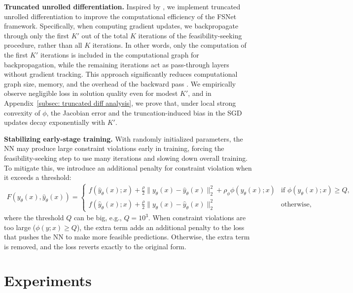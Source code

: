 \documentclass{article}
\def\x{x}
\def\y{y_{\theta}}   \def\hy{\hat{y}_{\theta}}    \def\ty{\Tilde{y}}
\begin{document}
\textbf{Truncated unrolled differentiation.} Inspired by \cite{shaban2019truncated}, we implement truncated unrolled differentiation to improve the computational efficiency of the FSNet framework. Specifically, when computing gradient updates, we backpropagate through only the first $K'$ out of the total $K$ iterations of the feasibility-seeking procedure, rather than all $K$ iterations.
In other words, only the computation of the first $K'$ iterations is included in the computational graph for backpropagation, while the remaining iterations act as pass-through layers without gradient tracking. 
This approach significantly reduces computational graph size, memory, and the overhead of the backward pass \cite{shaban2019truncated}. 
We empirically observe negligible loss in solution quality even for modest $K'$, and in Appendix~\ref{subsec: truncated diff analysis}, we prove that, under local strong convexity of $\phi$, the Jacobian error and the truncation-induced bias in the SGD updates decay exponentially with $K'$.

\textbf{Stabilizing early-stage training.}
With randomly initialized parameters, the NN may produce large constraint violations early in training, forcing the feasibility-seeking step to use many iterations and slowing down overall training. 
To mitigate this, we introduce an additional penalty for constraint violation when it exceeds a threshold:
    \begin{align}\label{eq: modified F}
    F(\y(\x), \hy(\x)) =
    \left\{ \begin{array}{ll}
         f(\hy(\x); \x) + \frac{\rho}{2} \| \y(\x)- \hy(\x)\|_2^2 + \rho_\phi \phi(\y(\x); \x)& \text{if } \phi(\y(\x);\x) \geq Q, \\
         f(\hy(\x); \x) + \frac{\rho}{2} \| \y(\x)- \hy(\x)\|_2^2 & \text{otherwise,}
    \end{array}
    \right.
\end{align}
where the threshold $Q$ can be big, e.g., $Q=10^3$.
When constraint violations are too large ($\phi(y; \x) \geq Q$), the extra term adds an additional penalty to the loss that pushes the NN to make more feasible predictions.
Otherwise, the extra term is removed, and the loss reverts exactly to the original form. 


\section{Experiments}\label{sec: experiments}
\end{document}
